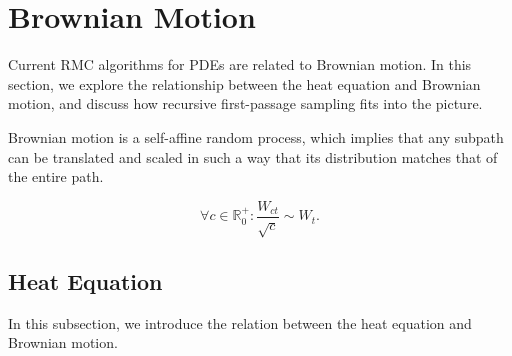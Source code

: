 \documentclass[a4paper,12pt]{article}
\begin{document}
\section{Brownian Motion}

Current RMC algorithms for PDEs are related to Brownian motion. In this section,
we explore the relationship between the heat equation and Brownian motion,
and discuss how recursive first-passage sampling fits into the picture.



\begin{lemma} \label{lem:self affine}
    Brownian motion is a self-affine random process, which implies
    that any subpath can be translated and scaled in such a way
    that its distribution matches that of the entire path.

    \begin{equation}
        \forall c \in \mathbb{R}^{+}_{0}: \frac{W_{ct}}{\sqrt{c}} \sim W_{t}.
    \end{equation}
\end{lemma}


\subsection{Heat Equation}
In this subsection, we introduce the relation between the heat equation and
Brownian motion.

\end{document}
